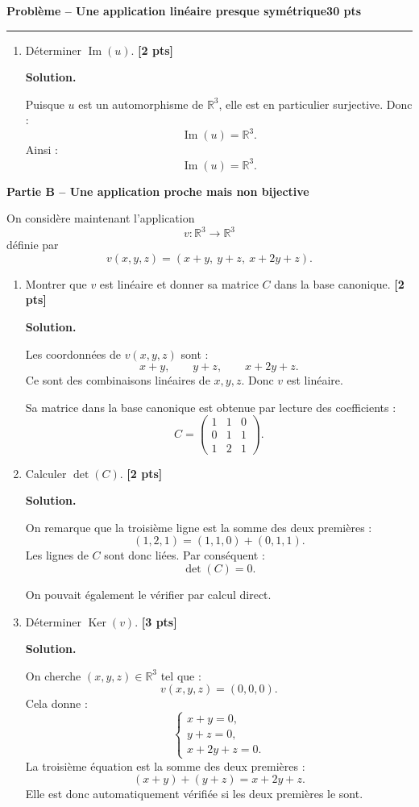 \documentclass[11pt,a4paper]{article}
\newcommand{\pts}[1]{\hfill \textbf{[#1 pts]}}
\newcommand{\R}{\mathbb{R}}
\newcommand{\Ker}{\operatorname{Ker}}
\newcommand{\Img}{\operatorname{Im}}
\newcounter{probleme}
\newenvironment{probleme}[2]{
    \refstepcounter{probleme}
    \vspace{0.6cm}
    {\Large\color{bleu}\textbf{Problème \theprobleme{} -- #1}}\hfill \textbf{#2 pts}
    \par\medskip
    \hrule
    \medskip
}{\vspace{0.5cm}}
\newcommand{\partie}[1]{
    \vspace{0.35cm}
    {\large\color{gris}\textbf{#1}}
    \par\smallskip
}
\newcommand{\solution}{
    \textbf{\color{bleu}Solution. }
}
\begin{document}
\begin{probleme}{Une application linéaire presque symétrique}{30}
\begin{enumerate}
    Ce résultat est cohérent avec le fait que \(u\) est un automorphisme : une application linéaire est injective si et seulement si son noyau est réduit au vecteur nul.

    \item Déterminer \(\Img(u)\). \pts{2}

    \solution

    Puisque \(u\) est un automorphisme de \(\R^3\), elle est en particulier surjective. Donc :
    \[
    \Img(u)=\R^3.
    \]
    Ainsi :
    \[
    \boxed{\Img(u)=\R^3.}
    \]
\end{enumerate}

\partie{Partie B -- Une application proche mais non bijective}

On considère maintenant l'application
\[
v:\R^3\longrightarrow \R^3
\]
définie par
\[
v(x,y,z)=(x+y,\ y+z,\ x+2y+z).
\]

\begin{enumerate}[resume]
    \item Montrer que \(v\) est linéaire et donner sa matrice \(C\) dans la base canonique. \pts{2}

    \solution

    Les coordonnées de \(v(x,y,z)\) sont :
    \[
    x+y,\qquad y+z,\qquad x+2y+z.
    \]
    Ce sont des combinaisons linéaires de \(x,y,z\). Donc \(v\) est linéaire.

    Sa matrice dans la base canonique est obtenue par lecture des coefficients :
    \[
    \boxed{
    C=
    \begin{pmatrix}
    1&1&0\\
    0&1&1\\
    1&2&1
    \end{pmatrix}.}
    \]

    \item Calculer \(\det(C)\). \pts{2}

    \solution

    On remarque que la troisième ligne est la somme des deux premières :
    \[
    (1,2,1)=(1,1,0)+(0,1,1).
    \]
    Les lignes de \(C\) sont donc liées. Par conséquent :
    \[
    \boxed{\det(C)=0.}
    \]

    On pouvait également le vérifier par calcul direct.

    \item Déterminer \(\Ker(v)\). \pts{3}

    \solution

    On cherche \((x,y,z)\in\R^3\) tel que :
    \[
    v(x,y,z)=(0,0,0).
    \]
    Cela donne :
    \[
    \begin{cases}
    x+y=0,\\
    y+z=0,\\
    x+2y+z=0.
    \end{cases}
    \]
    La troisième équation est la somme des deux premières :
    \[
    (x+y)+(y+z)=x+2y+z.
    \]
    Elle est donc automatiquement vérifiée si les deux premières le sont.


\end{enumerate}
\end{probleme}
\end{document}
